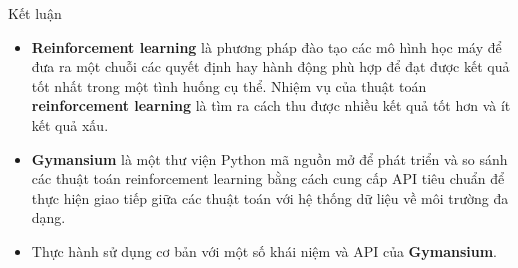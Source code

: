 \documentclass[10pt,aspectratio=169]{beamer}
\begin{document}
\begin{frame}{Kết luận}
\begin{itemize}
\setlength\itemsep{8pt}
\item \textbf{\textcolor{mainblue}{Reinforcement learning}} là phương pháp đào tạo các mô hình học máy để đưa ra một chuỗi các quyết định hay hành động phù hợp để đạt được kết quả tốt nhất trong một tình huống cụ thể. Nhiệm vụ của thuật toán \textbf{\textcolor{mainblue}{reinforcement learning}} là tìm ra cách thu được nhiều kết quả tốt hơn và ít kết quả xấu.
\item \textbf{\textcolor{mainblue}{Gymansium}} là một thư viện Python mã nguồn mở để phát triển và so sánh các thuật toán reinforcement learning bằng cách cung cấp API tiêu chuẩn để thực hiện giao tiếp giữa các thuật toán với hệ thống dữ liệu về môi trường đa dạng.
\item Thực hành sử dụng cơ bản với một số khái niệm và API của \textbf{\textcolor{mainblue}{Gymansium}}.
\end{itemize}
\end{frame}

\backmatter
\end{document}
